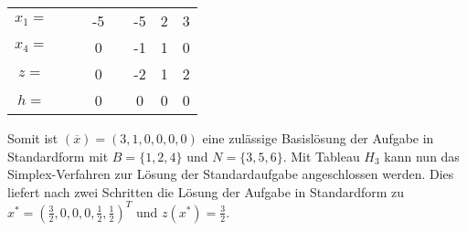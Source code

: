 \begin{example}
\begin{minipage}[c]{0.5\textwidth}
\begin{center}
\begin{tabular}{c|cccccc|c}
				$x_1 = $ &  &  & -5 &  & -5 & 2 & 3 \\
				$x_4 = $ &  &  & 0 &  & -1 & 1 & 0 \\
				\hline
				$z = $ &  &  & 0 &  & -2 & 1 & 2 \\
				\hline
				$h= $ &  &  & 0 &  & 0 & 0 & 0 \\
			\end{tabular}
		\end{center}
	\end{minipage}
	Somit ist $(\overline{x})=(3,1,0,0,0,0)$ eine zulässige Basislösung der Aufgabe in Standardform mit $B=\{1,2,4\}$ und $N=\{3,5,6\}$. Mit Tableau $H_3$ kann nun das Simplex-Verfahren zur Lösung der Standardaufgabe angeschlossen werden. Dies liefert nach zwei Schritten die Lösung der Aufgabe in Standardform zu $x^\ast=(\frac{3}{2},0,0,0,\frac{1}{2},\frac{1}{2})^T$ und $z(x^\ast)=\frac{3}{2}$.
\end{example}